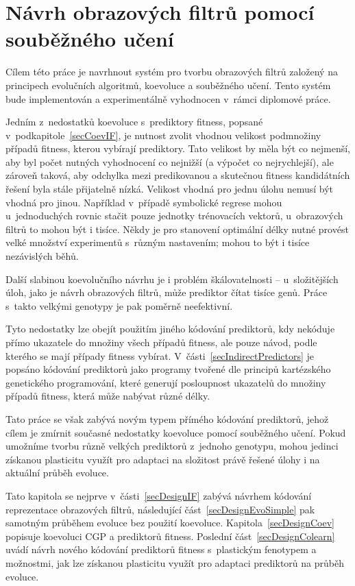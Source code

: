 \chapter{Návrh obrazových filtrů pomocí souběžného učení}
\label{chDesign}

Cílem této práce je navrhnout systém pro tvorbu obrazových filtrů založený na principech evolučních algoritmů, koevoluce a souběžného učení. Tento systém bude implementován a experimentálně vyhodnocen v~rámci diplomové práce.

Jedním z~nedostatků koevoluce s~prediktory fitness, popsané v~podkapitole~\ref{secCoevIF}, je nutnost zvolit vhodnou velikost podmnožiny případů fitness, kterou vybírají prediktory. Tato velikost by měla být co nejmenší, aby byl počet nutných vyhodnocení co nejnižší (a výpočet co nejrychlejší), ale zároveň taková, aby odchylka mezi predikovanou a skutečnou fitness kandidátních řešení byla stále přijatelně nízká. Velikost vhodná pro jednu úlohu nemusí být vhodná pro jinou. Například v~případě symbolické regrese mohou u~jednoduchých rovnic stačit pouze jednotky trénovacích vektorů, u~obrazových filtrů to mohou být i tisíce. Někdy je pro stanovení optimální délky nutné provést velké množství experimentů s~různým nastavením; mohou to být i tisíce nezávislých běhů.

Další slabinou koevolučního návrhu je i problém škálovatelnosti -- u~složitějších úloh, jako je návrh obrazových filtrů, může prediktor čítat tisíce genů. Práce s~takto velkými genotypy je pak poměrně neefektivní.

Tyto nedostatky lze obejít použitím jiného kódování prediktorů, kdy nekóduje přímo ukazatele do množiny všech případů fitness, ale pouze návod, podle kterého se mají případy fitness vybírat. V~části~\ref{secIndirectPredictors} je popsáno kódování prediktorů jako programy tvořené dle principů kartézského genetického programování, které generují posloupnost ukazatelů do množiny případů fitness, která může nabývat různé délky.

Tato práce se však zabývá novým typem přímého kódování prediktorů, jehož cílem je zmírnit současné nedostatky koevoluce pomocí souběžného učení. Pokud umožníme tvorbu různě velkých prediktorů z~jednoho genotypu, mohou jedinci získanou plasticitu využít pro adaptaci na složitost právě řešené úlohy i na aktuální průběh evoluce.

Tato kapitola se nejprve v~části~\ref{secDesignIF} zabývá návrhem kódování reprezentace obrazových filtrů, následující část~\ref{secDesignEvoSimple} pak samotným průběhem evoluce bez použití koevoluce. Kapitola~\ref{secDesignCoev} popisuje koevoluci CGP a prediktorů fitness. Poslední část~\ref{secDesignColearn} uvádí návrh nového kódování prediktorů fitness s~plastickým fenotypem a možnostmi, jak lze získanou plasticitu využít pro adaptaci prediktorů na průběh evoluce.

